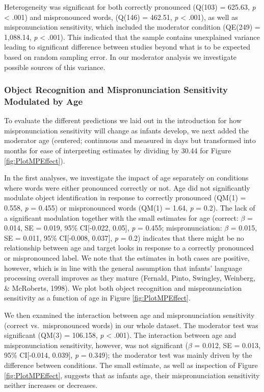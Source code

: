 \documentclass[man]{apa6}
\begin{document}
Heterogeneity was significant for both correctly pronounced (Q(103) = 625.63, \emph{p} \textless{} .001) and mispronounced words, (Q(146) = 462.51, \emph{p} \textless{} .001), as well as mispronunciation sensitivity, which included the moderator condition (QE(249) = 1,088.14, \emph{p} \textless{} .001). This indicated that the sample contains unexplained variance leading to significant difference between studies beyond what is to be expected based on random sampling error. In our moderator analysis we investigate possible sources of this variance.

\hypertarget{object-recognition-and-mispronunciation-sensitivity-modulated-by-age}{%
\subsubsection{Object Recognition and Mispronunciation Sensitivity Modulated by Age}\label{object-recognition-and-mispronunciation-sensitivity-modulated-by-age}}

To evaluate the different predictions we laid out in the introduction for how mispronunciation sensitivity will change as infants develop, we next added the moderator age (centered; continuous and measured in days but transformed into months for ease of interpreting estimates by dividing by 30.44 for Figure \ref{fig:PlotMPEffect}).

In the first analyses, we investigate the impact of age separately on conditions where words were either pronounced correctly or not. Age did not significantly modulate object identification in response to correctly pronounced (QM(1) = 0.558, \emph{p} = 0.455) or mispronounced words (QM(1) = 1.64, \emph{p} = 0.2). The lack of a significant modulation together with the small estimates for age (correct: \(\beta\) = 0.014, SE = 0.019, 95\% CI{[}-0.022, 0.05{]}, \emph{p} = 0.455; mispronunciation: \(\beta\) = 0.015, SE = 0.011, 95\% CI{[}-0.008, 0.037{]}, \emph{p} = 0.2) indicates that there might be no relationship between age and target looks in response to a correctly pronounced or mispronounced label. We note that the estimates in both cases are positive, however, which is in line with the general assumption that infants' language processing overall improves as they mature (Fernald, Pinto, Swingley, Weinberg, \& McRoberts, 1998). We plot both object recognition and mispronunciation sensitivity as a function of age in Figure \ref{fig:PlotMPEffect}.

We then examined the interaction between age and mispronunciation sensitivity (correct vs.~mispronounced words) in our whole dataset. The moderator test was significant (QM(3) = 106.158, \emph{p} \textless{} .001). The interaction between age and mispronunciation sensitivity, however, was not significant (\(\beta\) = 0.012, SE = 0.013, 95\% CI{[}-0.014, 0.039{]}, \emph{p} = 0.349); the moderator test was mainly driven by the difference between conditions. The small estimate, as well as inspection of Figure \ref{fig:PlotMPEffect}, suggests that as infants age, their mispronunciation sensitivity neither increases or decreases.
\end{document}
